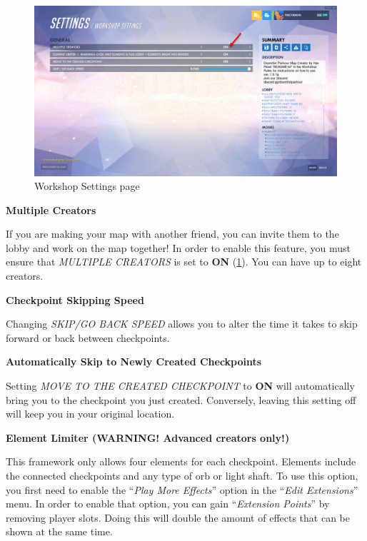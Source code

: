 \documentclass[12pt,a4paper]{article}
\begin{document}
        \begin{figure}[ht]
            \centering
            \includegraphics[width=\textwidth,height=\textheight,keepaspectratio]{Picture5.png}
            \caption{Workshop Settings page}
            \label{fig:Picture5}
        \end{figure}
        
        \textbf{Multiple Creators}
        
        If you are making your map with another friend, you can invite them to the lobby and work on the map together! In order to enable this feature, you must ensure that \textit{MULTIPLE CREATORS} is set to \textbf{ON} (\cref{fig:Picture5}). You can have up to eight creators.
        
        \textbf{Checkpoint Skipping Speed}
        
        Changing \textit{SKIP/GO BACK SPEED} allows you to alter the time it takes to skip forward or back between checkpoints.
        
        \textbf{Automatically Skip to Newly Created Checkpoints}
        
        Setting \textit{MOVE TO THE CREATED CHECKPOINT} to \textbf{ON} will automatically bring you to the checkpoint you just created. Conversely, leaving this setting off will keep you in your original location.
        
        \textbf{Element Limiter (WARNING! Advanced creators only!)}
        
        This framework only allows four elements for each checkpoint. Elements include the connected checkpoints and any type of orb or light shaft. To use this option, you first need to enable the ``\textit{Play More Effects}'' option in the ``\textit{Edit Extensions}'' menu. In order to enable that option, you can gain ``\textit{Extension Points}'' by removing player slots. Doing this will double the amount of effects that can be shown at the same time.
        
\end{document}
